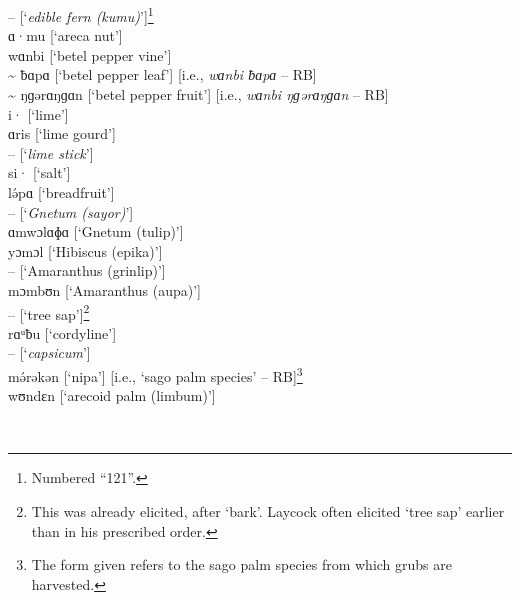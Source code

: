 \noindent --         [‘\textit{edible fern (kumu)}’]\footnote{Numbered “121”.}\\
ɑ·mu      [‘areca nut’]\\
wɑnbi       [‘betel pepper vine’]\\
{\textasciitilde} ƀɑpɑ      [‘betel pepper leaf’] [i.e., \textit{wɑnbi ƀɑpɑ} -- RB]\\
{\textasciitilde} ŋɡərɑŋɡɑn   [‘betel pepper fruit’] [i.e., \textit{wɑnbi ŋɡərɑŋɡɑn} -- RB]\\
i·         [‘lime’]\\
ɑris       [‘lime gourd’]\\
 --        [‘\textit{lime stick}’]\\
si·         [‘salt’]\\
lə́pɑ      [‘breadfruit’]\\
 --        [‘\textit{Gnetum (sayor)}’]\\
ɑmwɔlɑɸɑ   [‘Gnetum (tulip)’]\\
yɔmɔl       [‘Hibiscus (epika)’]\\
 --        [‘Amaranthus (grinlip)’]\\
mɔmbʊn     [‘Amaranthus (aupa)’]\\
 --        [‘tree sap’]\footnote{This was already elicited, after ‘bark’. Laycock often elicited ‘tree sap’ earlier than in his prescribed order.}\\
rɑᵘƀu       [‘cordyline’]\\
 --        [‘\textit{capsicum}’]\\
mə́rəkən     [‘nipa’] [i.e., ‘sago palm species’ -- RB]\footnote{The form given refers to the sago palm species from which grubs are harvested.}\\
wʊndɛn     [‘arecoid palm (limbum)’]\\


\\


